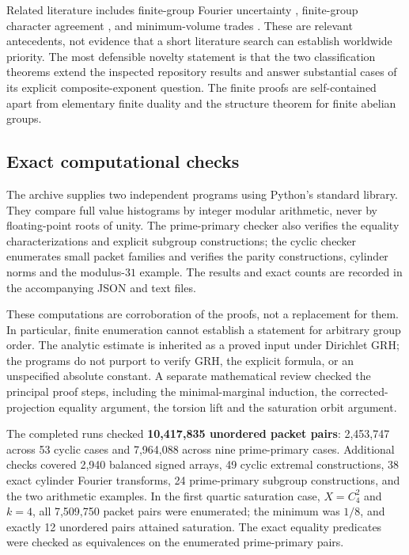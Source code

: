\documentclass[11pt]{article}
\theoremstyle{definition}
\theoremstyle{remark}
\begin{document}
Related literature includes finite-group Fourier uncertainty \cite{meshulam}, finite-group character agreement \cite{martinwalji}, and minimum-volume trades \cite{trades}. These are relevant antecedents, not evidence that a short literature search can establish worldwide priority. The most defensible novelty statement is that the two classification theorems extend the inspected repository results and answer substantial cases of its explicit composite-exponent question. The finite proofs are self-contained apart from elementary finite duality and the structure theorem for finite abelian groups.

\subsection{Exact computational checks}
The archive supplies two independent programs using Python's standard library. They compare full value histograms by integer modular arithmetic, never by floating-point roots of unity. The prime-primary checker also verifies the equality characterizations and explicit subgroup constructions; the cyclic checker enumerates small packet families and verifies the parity constructions, cylinder norms and the modulus-$31$ example. The results and exact counts are recorded in the accompanying JSON and text files.

These computations are corroboration of the proofs, not a replacement for them. In particular, finite enumeration cannot establish a statement for arbitrary group order. The analytic estimate is inherited as a proved input under Dirichlet GRH; the programs do not purport to verify GRH, the explicit formula, or an unspecified absolute constant. A separate mathematical review checked the principal proof steps, including the minimal-marginal induction, the corrected-projection equality argument, the torsion lift and the saturation orbit argument.

The completed runs checked \textbf{10,417,835 unordered packet pairs}: 2,453,747 across 53 cyclic cases and 7,964,088 across nine prime-primary cases. Additional checks covered 2,940 balanced signed arrays, 49 cyclic extremal constructions, 38 exact cylinder Fourier transforms, 24 prime-primary subgroup constructions, and the two arithmetic examples. In the first quartic saturation case, $X=C_4^2$ and $k=4$, all 7,509,750 packet pairs were enumerated; the minimum was $1/8$, and exactly 12 unordered pairs attained saturation. The exact equality predicates were checked as equivalences on the enumerated prime-primary pairs.
\end{document}
